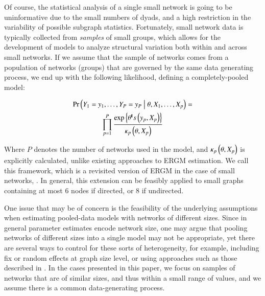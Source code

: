 \documentclass[review, nonatbib,doubleblind]{elsarticle/elsarticle}
\begin{document}
Of course, the statistical analysis of a single small network is going to be uninformative due to the small numbers of dyads, and a high restriction in the variability of possible subgraph statistics. Fortunately, small network data is typically collected from \textit{samples} of small groups, which allows for the development of models to analyze structural variation both within and across small networks. If we assume that the sample of networks comes from a population of networks (groups) that are governed by the same data generating process, we end up with the following likelihood, defining a completely-pooled model:

\begin{multline}
    \label{eq:ergm-pooled}
    \Prcond{\Adjmat_1 = \adjmat_1, \dots, \Adjmat_P = \adjmat_P}{\params, \Indepvar_1, \dots, \Indepvar_p} = \\
    \prod_{p=1}^P\frac{%
    		\exp{\transpose{\params}\sufstats{\adjmat_p, \Indepvar_p}}%
    	}{
    		\kappa_p\left(\params, \Indepvar_p\right)
    	}
\end{multline}

\noindent Where $P$ denotes the number of networks used in the model, and $\kappa_p\left(\theta, X_p\right)$ is explicitly calculated, unlike existing approaches to ERGM estimation. We call this framework, which is a revisited version of ERGM in the case of small networks, \ergmito{}. In general, this extension can be feasibly applied to small graphs containing at most 6 nodes if directed, or 8 if undirected. %

One issue that may be of concern is the feasibility of the underlying assumptions when estimating pooled-data models with networks of different sizes. Since in general parameter estimates encode network size, one may argue that pooling networks of different sizes into a single model may not be appropriate, yet there are several ways to control for these sorts of heterogeneity, for example, including fix or random effects at graph size level, or using approaches such as those described in \cite{Krivitsky2011,Krivitsky2015,Butts2015}. In the cases presented in this paper, we focus on samples of networks that are of similar sizes, and thus within a small range of values, and we assume there is a common data-generating process. 
\end{document}
